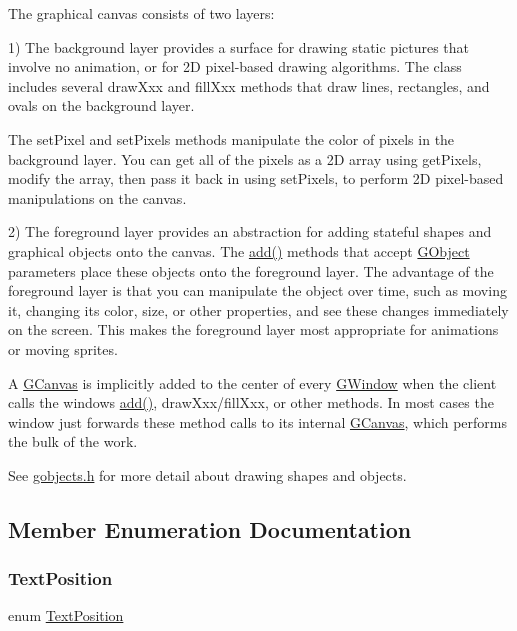 The graphical canvas consists of two layers\+:

1) The background layer provides a surface for drawing static pictures that involve no animation, or for 2D pixel-\/based drawing algorithms. The class includes several draw\+Xxx and fill\+Xxx methods that draw lines, rectangles, and ovals on the background layer.

The set\+Pixel and set\+Pixels methods manipulate the color of pixels in the background layer. You can get all of the pixels as a 2D array using get\+Pixels, modify the array, then pass it back in using set\+Pixels, to perform 2D pixel-\/based manipulations on the canvas.

2) The foreground layer provides an abstraction for adding stateful shapes and graphical objects onto the canvas. The \mbox{\hyperlink{classsgl_1_1GCanvas_afe8277e7b2627513c6f7452fb0b2847d}{add()}} methods that accept \mbox{\hyperlink{classsgl_1_1GObject}{G\+Object}} parameters place these objects onto the foreground layer. The advantage of the foreground layer is that you can manipulate the object over time, such as moving it, changing its color, size, or other properties, and see these changes immediately on the screen. This makes the foreground layer most appropriate for animations or moving sprites.

A \mbox{\hyperlink{classsgl_1_1GCanvas}{G\+Canvas}} is implicitly added to the center of every \mbox{\hyperlink{classsgl_1_1GWindow}{G\+Window}} when the client calls the window\textquotesingle{}s \mbox{\hyperlink{classsgl_1_1GCanvas_afe8277e7b2627513c6f7452fb0b2847d}{add()}}, draw\+Xxx/fill\+Xxx, or other methods. In most cases the window just forwards these method calls to its internal \mbox{\hyperlink{classsgl_1_1GCanvas}{G\+Canvas}}, which performs the bulk of the work.

See \mbox{\hyperlink{gobjects_8h_source}{gobjects.\+h}} for more detail about drawing shapes and objects. 

\subsection{Member Enumeration Documentation}
\mbox{\label{classsgl_1_1GInteractor_a8e0d441725a81d2bbdebbea09078260e}} 
\subsubsection{\texorpdfstring{Text\+Position}{TextPosition}}
{\footnotesize\ttfamily enum \mbox{\hyperlink{classsgl_1_1GInteractor_a8e0d441725a81d2bbdebbea09078260e}{Text\+Position}}\hspace{0.3cm}{\ttfamily [inherited]}}



